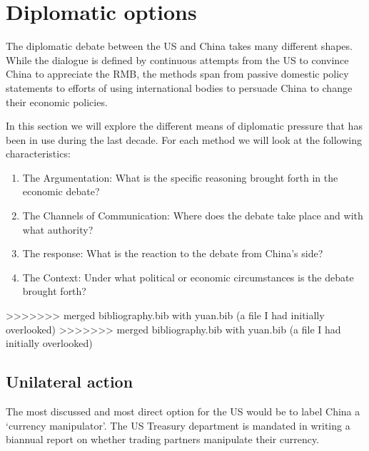\section{Diplomatic options}


The diplomatic debate between the US and China takes many different 
shapes. While the dialogue is defined by continuous attempts from the US 
to convince China to appreciate the RMB, the methods span from passive 
domestic policy statements to efforts of using international bodies to 
persuade China to change their economic policies.

In this section we will explore the different means of diplomatic 
pressure that has been in use during the last decade. For each method we 
will look at the following characteristics:

\begin{enumerate}
	\item{The Argumentation: What is the specific reasoning brought 
		forth in the economic debate?}
	\item{The Channels of Communication: Where does the debate take 
		place and with what authority?}
	\item{The response: What is the reaction to the debate from China's 
		side?}
	\item{The Context: Under what political or economic circumstances is 
		the debate brought forth?}
\end{enumerate}



>>>>>>> merged bibliography.bib with yuan.bib (a file I had initially overlooked)
>>>>>>> merged bibliography.bib with yuan.bib (a file I had initially overlooked)
\subsection{Unilateral action}

The most discussed and most direct option for the US would be to label China a `currency manipulator'. The US Treasury department is mandated in writing a biannual report on whether trading partners manipulate their currency.  


